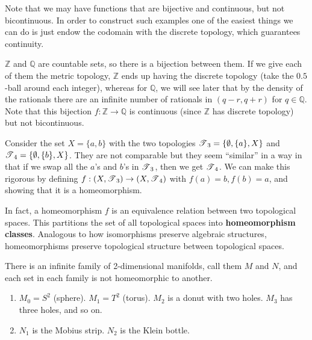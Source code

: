   Note that we may have functions that are bijective and continuous, but not bicontinuous. In order to construct such examples one of the easiest things we can do is just endow the codomain with the discrete topology, which guarantees continuity. 

  \begin{example}
    $\mathbb{Z}$ and $\mathbb{Q}$ are countable sets, so there is a bijection between them. If we give each of them the metric topology, $\mathbb{Z}$ ends up having the discrete topology (take the $0.5$-ball around each integer), whereas for $\mathbb{Q}$, we will see later that by the density of the rationals there are an infinite number of rationals in $(q - r, q + r)$ for $q \in \mathbb{Q}$. Note that this bijection $f: \mathbb{Z} \rightarrow \mathbb{Q}$ is continuous (since $\mathbb{Z}$ has discrete topology) but not bicontinuous. 
  \end{example}


  \begin{example}
    Consider the set $X = \{a, b\}$ with the two topologies $\operatorname{\mathscr{T}}_3 = \{\emptyset, \{a\}, X\}$ and $\operatorname{\mathscr{T}}_4 = \{\emptyset, \{b\}, X\}$. They are not comparable but they seem ``similar'' in a way in that if we swap all the $a$'s and $b$'s in $\operatorname{\mathscr{T}}_3$, then we get $\operatorname{\mathscr{T}}_4$. We can make this rigorous by defining $f: (X, \operatorname{\mathscr{T}}_3) \rightarrow (X, \operatorname{\mathscr{T}}_4)$ with $f(a) = b, f(b) = a$, and showing that it is a homeomorphism. 
  \end{example}

  In fact, a homeomorphism $f$ is an equivalence relation between two topological spaces. This partitions the set of all topological spaces into \textbf{homeomorphism classes}. Analogous to how isomorphisms preserve algebraic structures, homeomorphisms preserve topological structure between topological spaces. 

  \begin{example}
    There is an infinite family of 2-dimensional manifolds, call them $M$ and $N$, and each set in each family is not homeomorphic to another.  
    \begin{enumerate}
      \item $M_0 = S^2$ (sphere). $M_1 = T^2$ (torus). $M_2$ is a donut with two holes. $M_3$ has three holes, and so on. 
      \item $N_1$ is the Mobius strip. $N_2$ is the Klein bottle. 
    \end{enumerate}
  \end{example}

